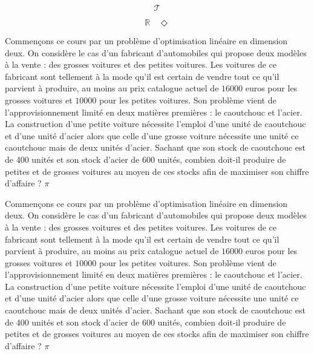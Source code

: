 \documentclass[a4paper, 11pt,openany]{book}%
\newtheorem[L]{thm}{Théorème}[section]
\newtheorem[M]{propo}[thm]{Proposition}
\newtheorem[M]{prop}[thm]{Propriété}
\newtheorem[M]{coro}[thm]{Corollaire}
\newtheorem[M]{lem}[thm]{Lemme}
\newtheorem[M,bodystyle=]{defi}[thm]{Définition}
\newtheorem[M,bodystyle=]{remark}[thm]{Remarque}
\newtheorem[M,bodystyle=]{met}[thm]{Méthode}
\newtheorem[M,bodystyle=]{ret}[thm]{A retenir}
\newtheorem[M,bodystyle=]{idee}[thm]{Idée}
\newtheorem[style=S,underline=false,bodystyle=]{exem}[thm]{Exemple}
\newtheorem[S,underline=false,bodystyle=]{exo}[thm]{Exercice}
\newtheorem[S,underline=false,bodystyle=]{appli}[thm]{Application}
\newtheorem[S,underline=false,bodystyle=]{sol}[thm]{Solution}
\newtheorem[S,underline=false,bodystyle=]{hypo}[thm]{Hypothesis}
\newtheorem[S,underline=false,bodystyle=]{nota}[thm]{Notation}
\begin{document}
   \[ \mathcal{T}\]

    \[ \mathbb{R} \quad \Diamond\]

   

   

      Commençons ce cours par un problème d'optimisation linéaire en dimension deux. On considère le cas d'un fabricant d'automobiles qui propose deux modèles à la vente : des grosses voitures et des petites voitures. Les voitures de ce fabricant sont tellement à la mode qu'il est certain de vendre tout ce qu'il parvient à produire, au moins au prix catalogue actuel de $16000$ euros pour les grosses voitures et $10000$ pour les petites voitures. Son problème vient de l'approvisionnement limité en deux matières premières : le caoutchouc et l'acier. La construction d'une petite voiture nécessite l'emploi d'une unité de caoutchouc et d'une unité d'acier alors que celle d'une grosse voiture nécessite une unité ce caoutchouc mais de deux unités d'acier. Sachant que son stock de caoutchouc est de 400 unités et son stock d'acier de 600 unités, combien doit-il produire de petites et de grosses voitures au moyen de ces stocks afin de maximiser son chiffre d'affaire ? $\pi$

      




                 Commençons ce cours par un problème d'optimisation linéaire en dimension deux. On considère le cas d'un fabricant d'automobiles qui propose deux modèles à la vente : des grosses voitures et des petites voitures. Les voitures de ce fabricant sont tellement à la mode qu'il est certain de vendre tout ce qu'il parvient à produire, au moins au prix catalogue actuel de $16000$ euros pour les grosses voitures et $10000$ pour les petites voitures. Son problème vient de l'approvisionnement limité en deux matières premières : le caoutchouc et l'acier. La construction d'une petite voiture nécessite l'emploi d'une unité de caoutchouc et d'une unité d'acier alors que celle d'une grosse voiture nécessite une unité ce caoutchouc mais de deux unités d'acier. Sachant que son stock de caoutchouc est de 400 unités et son stock d'acier de 600 unités, combien doit-il produire de petites et de grosses voitures au moyen de ces stocks afin de maximiser son chiffre d'affaire ? $\pi$
\end{document}
